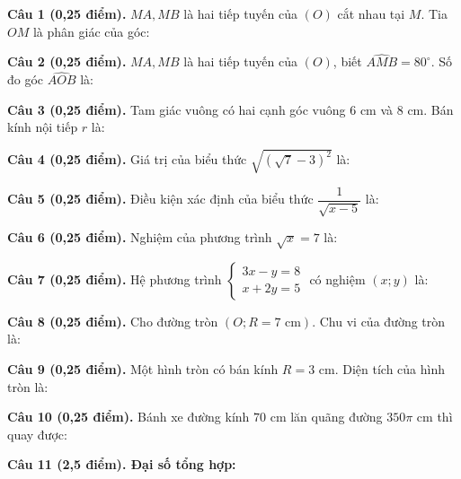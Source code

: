 \documentclass[12pt,a4paper]{article}
\begin{document}
\vspace{1.2mm}
\noindent\textbf{Câu 1 (0,25 điểm).} $MA, MB$ là hai tiếp tuyến của $(O)$ cắt nhau tại $M$. Tia $OM$ là phân giác của góc: \par\vspace{0.5mm}
\noindent\textbf{Câu 2 (0,25 điểm).} $MA, MB$ là hai tiếp tuyến của $(O)$, biết $\widehat{AMB} = 80^\circ$. Số đo góc $\widehat{AOB}$ là: \par\vspace{0.5mm}
\noindent\textbf{Câu 3 (0,25 điểm).} Tam giác vuông có hai cạnh góc vuông $6\text{ cm}$ và $8\text{ cm}$. Bán kính nội tiếp $r$ là: \par\vspace{0.5mm}
\noindent\textbf{Câu 4 (0,25 điểm).} Giá trị của biểu thức $\sqrt{(\sqrt{7} - 3)^2}$ là: \par\vspace{0.5mm}
\noindent\textbf{Câu 5 (0,25 điểm).} Điều kiện xác định của biểu thức $\dfrac{1}{\sqrt{x - 5}}$ là: \par\vspace{0.5mm}
\noindent\textbf{Câu 6 (0,25 điểm).} Nghiệm của phương trình $\sqrt{x} = 7$ là: \par\vspace{0.5mm}
\noindent\textbf{Câu 7 (0,25 điểm).} Hệ phương trình $\begin{cases} 3x - y = 8 \\ x + 2y = 5 \end{cases}$ có nghiệm $(x; y)$ là: \par\vspace{0.5mm}
\noindent\textbf{Câu 8 (0,25 điểm).} Cho đường tròn $(O; R = 7\text{ cm})$. Chu vi của đường tròn là: \par\vspace{0.5mm}
\noindent\textbf{Câu 9 (0,25 điểm).} Một hình tròn có bán kính $R = 3\text{ cm}$. Diện tích của hình tròn là: \par\vspace{0.5mm}
\noindent\textbf{Câu 10 (0,25 điểm).} Bánh xe đường kính $70\text{ cm}$ lăn quãng đường $350\pi\text{ cm}$ thì quay được: \par\vspace{0.5mm}
\vspace{0.8mm}
\noindent\textbf{Câu 11 (2,5 điểm). Đại số tổng hợp:}
\vspace{0.6mm}
\end{document}
